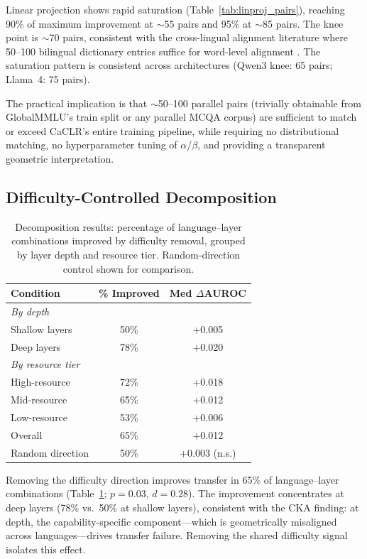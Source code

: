 \documentclass[11pt,a4paper]{article}
\begin{document}
Linear projection shows rapid saturation (Table~\ref{tab:linproj_pairs}), reaching 90\% of maximum improvement at $\sim$55 pairs and 95\% at $\sim$85 pairs. The knee point is $\sim$70 pairs, consistent with the cross-lingual alignment literature where 50--100 bilingual dictionary entries suffice for word-level alignment \cite{conneau2018muse,artetxe2018vecmap}. The saturation pattern is consistent across architectures (Qwen3 knee: 65 pairs; Llama~4: 75 pairs).

The practical implication is that $\sim$50--100 parallel pairs (trivially obtainable from GlobalMMLU's train split or any parallel MCQA corpus) are sufficient to match or exceed CaCLR's entire training pipeline, while requiring no distributional matching, no hyperparameter tuning of $\alpha$/$\beta$, and providing a transparent geometric interpretation.

\subsection{Difficulty-Controlled Decomposition}
\label{sec:decomp_results}

\begin{table}[t]
\centering
\small
\caption{Decomposition results: percentage of language--layer combinations improved by difficulty removal, grouped by layer depth and resource tier. Random-direction control shown for comparison.}
\label{tab:decomp}
\begin{tabular}{lcc}
\toprule
\textbf{Condition} & \textbf{\% Improved} & \textbf{Med $\Delta$AUROC} \\
\midrule
\multicolumn{3}{l}{\emph{By depth}} \\
\quad Shallow layers & 50\% & +0.005 \\
\quad Deep layers & 78\% & +0.020 \\
\midrule
\multicolumn{3}{l}{\emph{By resource tier}} \\
\quad High-resource & 72\% & +0.018 \\
\quad Mid-resource & 65\% & +0.012 \\
\quad Low-resource & 53\% & +0.006 \\
\midrule
Overall & 65\% & +0.012 \\
Random direction & 50\% & +0.003 (n.s.) \\
\bottomrule
\end{tabular}
\end{table}

Removing the difficulty direction improves transfer in 65\% of language--layer combinations (Table~\ref{tab:decomp}; $p = 0.03$, $d = 0.28$). The improvement concentrates at deep layers (78\% vs.\ 50\% at shallow layers), consistent with the CKA finding: at depth, the capability-specific component---which is geometrically misaligned across languages---drives transfer failure. Removing the shared difficulty signal isolates this effect.
\end{document}
